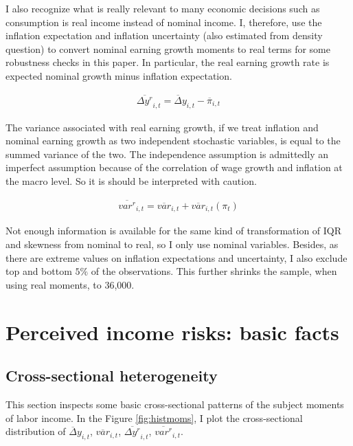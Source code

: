\documentclass[12pt,notitlepage,onecolumn,aps,pra]{article}
\begin{document}
I also recognize what is really relevant to many economic decisions such
as consumption is real income instead of nominal income. I, therefore,
use the inflation expectation and inflation uncertainty (also estimated
from density question) to convert nominal earning growth moments to real
terms for some robustness checks in this paper. In particular, the real
earning growth rate is expected nominal growth minus inflation
expectation.

\begin{eqnarray}
\overline {\Delta y^{r}}_{i,t} = \overline\Delta y_{i,t} - \overline \pi_{i,t}
\end{eqnarray}

The variance associated with real earning growth, if we treat inflation
and nominal earning growth as two independent stochastic variables, is
equal to the summed variance of the two. The independence assumption is
admittedly an imperfect assumption because of the correlation of wage
growth and inflation at the macro level. So it is should be interpreted
with caution.

\begin{eqnarray}
\overline{var^{r}}_{i,t} = \overline{var}_{i,t} + \overline{var}_{i,t}(\pi_{t})
\end{eqnarray}

Not enough information is available for the same kind of transformation
of IQR and skewness from nominal to real, so I only use nominal
variables. Besides, as there are extreme values on inflation
expectations and uncertainty, I also exclude top and bottom \(5\%\) of
the observations. This further shrinks the sample, when using real
moments, to 36,000.

    \hypertarget{perceived-income-risks-basic-facts}{%
\section{Perceived income risks: basic
facts}\label{perceived-income-risks-basic-facts}}

\hypertarget{cross-sectional-heterogeneity}{%
\subsection{Cross-sectional
heterogeneity}\label{cross-sectional-heterogeneity}}

This section inspects some basic cross-sectional patterns of the subject
moments of labor income. In the Figure \ref{fig:histmoms}, I plot the
cross-sectional distribution of \(\overline\Delta y_{i,t}\),
\(\overline{var}_{i,t}\), \(\overline {\Delta y^{r}}_{i,t}\),
\(\overline{var^{r}}_{i,t}\).
\end{document}
